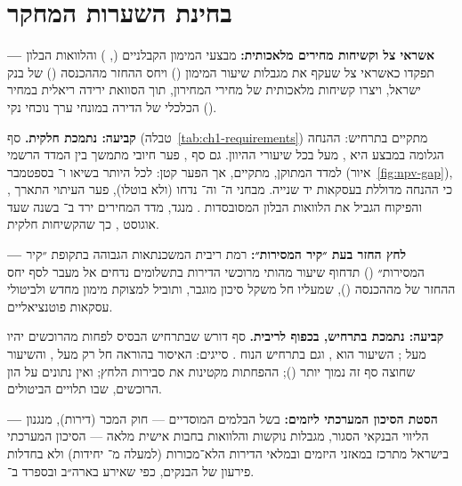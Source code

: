 \section{בחינת השערות המחקר}
\label{sec:ch6-hypotheses}

\begin{researchquestion}[השערה \en{H1}]
\textbf{ — אשראי צל וקשיחות מחירים מלאכותית:} מבצעי המימון הקבלניים (, ) והלוואות הבלון תפקדו כאשראי צל  שעקף את מגבלות שיעור המימון () ויחס ההחזר מההכנסה () של בנק ישראל, ויצרו קשיחות מלאכותית של מחירי המחירון, תוך הסוואת ירידה ריאלית במחיר הכלכלי של הדירה במונחי ערך נוכחי נקי ().
\end{researchquestion}

\textbf{קביעה: נתמכת חלקית.} סף \mbox{} (טבלה~\ref{tab:ch1-requirements}) מתקיים בתרחיש: ההנחה הגלומה במבצע  היא , מעל  בכל שיעורי ההיוון. גם סף \mbox{}, פער חיובי מתמשך בין המדד הרשמי למדד המתוקן, מתקיים, אך הפער קטן:  לכל היותר בשיאו ו־ בספטמבר  (איור~\ref{fig:npv-gap}), כי ההנחה מדוללת בעסקאות יד שנייה. מבחני ה־ וה־ נדחו (ולא בוטלו), פער העיתוי התארך \cite{boi2026_resloans}, והפיקוח הגביל את הלוואות הבלון המסובסדות \cite{boi_circular2816}. מנגד, מדד המחירים ירד ב־ בשנה שעד אוגוסט  \cite{toi_housing_2026_10}, כך שהקשיחות חלקית.

\begin{researchquestion}[השערה \en{H2}]
\textbf{ — לחץ החזר בעת ״קיר המסירות״:} רמת ריבית המשכנתאות הגבוהה בתקופת ״קיר המסירות״ () תדחוף שיעור מהותי מרוכשי הדירות בתשלומים נדחים אל מעבר לסף יחס ההחזר של  מההכנסה (), שמעליו חל משקל סיכון מוגבר, ותוביל למצוקת מימון מחדש  ולביטולי עסקאות פוטנציאליים.
\end{researchquestion}

\textbf{קביעה: נתמכת בתרחיש, בכפוף לריבית.} סף  דורש שבתרחיש הבסיס לפחות  מהרוכשים יהיו מעל ; השיעור הוא , וגם בתרחיש הנוח . סייגים: האיסור בהוראה  חל רק מעל  \cite{boi_directive329}, והשיעור שחוצה סף זה נמוך יותר (); ההפחתות מקטינות את סבירות הלחץ; ואין נתונים על הון הרוכשים, שבו תלויים הביטולים.

\begin{researchquestion}[השערה \en{H3}]
\textbf{ — הסטת הסיכון המערכתי ליזמים:} בשל הבלמים המוסדיים — חוק המכר (דירות), מנגנון הליווי הבנקאי הסגור, מגבלות  נוקשות והלוואות בחבות אישית מלאה  — הסיכון המערכתי בישראל מתרכז במאזני היזמים ובמלאי הדירות הלא־מכורות (למעלה מ־ יחידות) ולא בחדלות פירעון של הבנקים, כפי שאירע בארה״ב ובספרד ב־.
\end{researchquestion}

